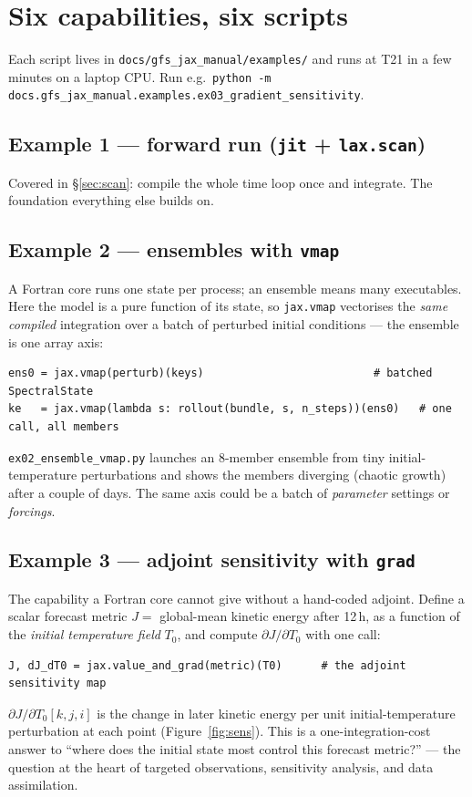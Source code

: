 \documentclass[11pt]{article}
\newcommand{\code}[1]{\texttt{#1}}
\begin{document}
\section{Six capabilities, six scripts}\label{sec:examples}

Each script lives in \code{docs/gfs\_jax\_manual/examples/} and runs at T21 in a few
minutes on a laptop CPU. Run e.g.\ \code{python -m
docs.gfs\_jax\_manual.examples.ex03\_gradient\_sensitivity}.

\subsection{Example 1 --- forward run (\code{jit} + \code{lax.scan})}
Covered in \S\ref{sec:scan}: compile the whole time loop once and integrate.
The foundation everything else builds on.

\subsection{Example 2 --- ensembles with \code{vmap}}\label{sec:vmap}
A Fortran core runs one state per process; an ensemble means many executables.
Here the model is a pure function of its state, so \code{jax.vmap} vectorises the
\emph{same compiled} integration over a batch of perturbed initial conditions --- the
ensemble is one array axis:
\begin{lstlisting}
ens0 = jax.vmap(perturb)(keys)                          # batched SpectralState
ke   = jax.vmap(lambda s: rollout(bundle, s, n_steps))(ens0)   # one call, all members
\end{lstlisting}
\code{ex02\_ensemble\_vmap.py} launches an 8-member ensemble from tiny
initial-temperature perturbations and shows the members diverging (chaotic growth)
after a couple of days. The same axis could be a batch of \emph{parameter} settings
or \emph{forcings}.

\subsection{Example 3 --- adjoint sensitivity with \code{grad}}
The capability a Fortran core cannot give without a hand-coded adjoint. Define a
scalar forecast metric $J=$ global-mean kinetic energy after 12\,h, as a function
of the \emph{initial temperature field} $T_0$, and compute $\partial J/\partial
T_0$ with one call:
\begin{lstlisting}
J, dJ_dT0 = jax.value_and_grad(metric)(T0)      # the adjoint sensitivity map
\end{lstlisting}
$\partial J/\partial T_0[k,j,i]$ is the change in later kinetic energy per unit
initial-temperature perturbation at each point (Figure~\ref{fig:sens}). This is a
one-integration-cost answer to ``where does the initial state most control this
forecast metric?'' --- the question at the heart of targeted observations,
sensitivity analysis, and data assimilation.
\end{document}
